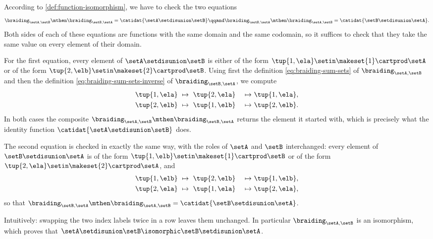 \begin{solution}
    According to \cref{def:function-isomorphism}, we have to check the two equations
    \begin{equation}\label{eq:braiding-sum-sets-inverse-equations}
        \braiding_{\setA, \setB} \mthen \braiding_{\setB, \setA} = \catidat{\setA \setdisunion \setB}
        \qqand
        \braiding_{\setB, \setA} \mthen \braiding_{\setA, \setB} = \catidat{\setB \setdisunion \setA}.
    \end{equation}
    Both sides of each of these equations are functions with the same domain and the same codomain, so it suffices to check that they take the same value on every element of their domain.

    For the first equation, every element of $\setA \setdisunion \setB$ is either of the form $\tup{1, \ela} \setin \makeset{1} \cartprod \setA$ or of the form $\tup{2, \elb} \setin \makeset{2} \cartprod \setB$. Using first the definition \cref{eq:braiding-sum-sets} of $\braiding_{\setA, \setB}$ and then the definition \cref{eq:braiding-sum-sets-inverse} of $\braiding_{\setB, \setA}$, we compute
    \begin{equation}
        \begin{aligned}
            \tup{1, \ela} & \ \mapsto \ \tup{2, \ela} & \ \mapsto \ & \tup{1, \ela}, \\
            \tup{2, \elb} & \ \mapsto \ \tup{1, \elb} & \ \mapsto \ & \tup{2, \elb}.
        \end{aligned}
    \end{equation}
    In both cases the composite $\braiding_{\setA, \setB} \mthen \braiding_{\setB, \setA}$ returns the element it started with, which is precisely what the identity function $\catidat{\setA \setdisunion \setB}$ does.

    The second equation is checked in exactly the same way, with the roles of $\setA$ and $\setB$ interchanged: every element of $\setB \setdisunion \setA$ is of the form $\tup{1, \elb} \setin \makeset{1} \cartprod \setB$ or of the form $\tup{2, \ela} \setin \makeset{2} \cartprod \setA$, and
    \begin{equation}
        \begin{aligned}
            \tup{1, \elb} & \ \mapsto \ \tup{2, \elb} & \ \mapsto \ & \tup{1, \elb}, \\
            \tup{2, \ela} & \ \mapsto \ \tup{1, \ela} & \ \mapsto \ & \tup{2, \ela},
        \end{aligned}
    \end{equation}
    so that $\braiding_{\setB, \setA} \mthen \braiding_{\setA, \setB} = \catidat{\setB \setdisunion \setA}$.

    Intuitively: swapping the two index labels twice in a row leaves them unchanged. In particular $\braiding_{\setA, \setB}$ is an isomorphism, which proves that $\setA \setdisunion \setB \isomorphic \setB \setdisunion \setA$.
\end{solution}

